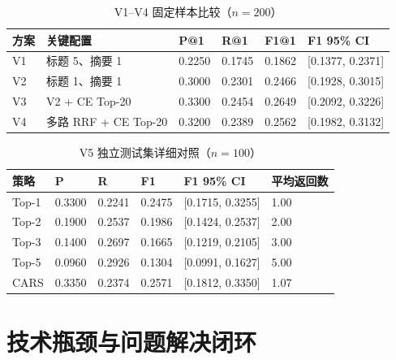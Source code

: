 \documentclass[a4paper,11pt,fontset=none]{ctexart}
\begin{document}
\begin{table}[H]
\centering
\caption{V1--V4 固定样本比较（$n=200$）}
\small
\begin{tabular}{C{2.1cm} C{4.0cm} C{1.25cm} C{1.25cm} C{1.25cm} C{2.5cm}}
\toprule
\textbf{方案} & \textbf{关键配置} & \textbf{P@1} & \textbf{R@1} & \textbf{F1@1} & \textbf{F1 95\% CI} \\
\midrule
V1 & 标题 5、摘要 1 & 0.2250 & 0.1745 & 0.1862 & [0.1377, 0.2371] \\
V2 & 标题 1、摘要 1 & 0.3000 & 0.2301 & 0.2466 & [0.1928, 0.3015] \\
V3 & V2 + CE Top-20 & 0.3300 & 0.2454 & 0.2649 & [0.2092, 0.3226] \\
V4 & 多路 RRF + CE Top-20 & 0.3200 & 0.2389 & 0.2562 & [0.1982, 0.3132] \\
\bottomrule
\end{tabular}
\end{table}

\begin{table}[H]
\centering
\caption{V5 独立测试集详细对照（$n=100$）}
\small
\begin{tabular}{C{2.2cm} C{1.3cm} C{1.3cm} C{1.5cm} C{2.4cm} C{1.8cm}}
\toprule
\textbf{策略} & \textbf{P} & \textbf{R} & \textbf{F1} & \textbf{F1 95\% CI} & \textbf{平均返回数} \\
\midrule
Top-1 & 0.3300 & 0.2241 & 0.2475 & [0.1715, 0.3255] & 1.00 \\
Top-2 & 0.1900 & 0.2537 & 0.1986 & [0.1424, 0.2537] & 2.00 \\
Top-3 & 0.1400 & 0.2697 & 0.1665 & [0.1219, 0.2105] & 3.00 \\
Top-5 & 0.0960 & 0.2926 & 0.1304 & [0.0991, 0.1627] & 5.00 \\
CARS & 0.3350 & 0.2374 & 0.2571 & [0.1812, 0.3350] & 1.07 \\
\bottomrule
\end{tabular}
\end{table}

\section{技术瓶颈与问题解决闭环}
\end{document}
